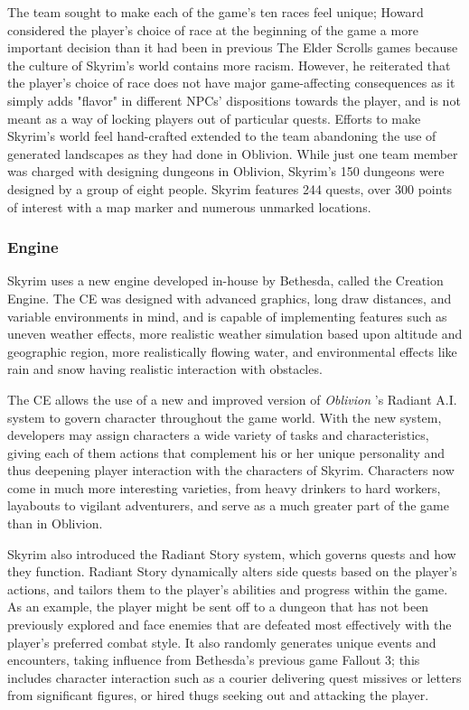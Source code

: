 \documentclass[a4paper,10pt]{book}
\begin{document}
          The team sought to make each of the game's ten races feel unique; Howard considered the player's choice of race at the beginning of the game a more important decision than it had been in previous The Elder Scrolls games because the culture of Skyrim's world contains more racism.
           However, he reiterated that the player's choice of race does not have major game-affecting consequences as it simply adds "flavor" in different NPCs' dispositions towards the player, and is not meant as a way of locking players out of particular quests.
            Efforts to make Skyrim's world feel hand-crafted extended to the team abandoning the use of generated landscapes as they had done in Oblivion. While just one team member was charged with designing dungeons in Oblivion, Skyrim's 150 dungeons were designed by a group of eight people.
             Skyrim features 244 quests, over 300 points of interest with a map marker and numerous unmarked locations.
         
 
 \subsubsection{ Engine }
 
          Skyrim uses a new engine developed in-house by Bethesda, called the Creation Engine.
          The CE was designed with advanced graphics, long draw distances, and variable environments in mind,
           and is capable of implementing features such as uneven weather effects, more realistic weather simulation based upon altitude and geographic region,
            more realistically flowing water, and environmental effects like rain and snow having realistic interaction with obstacles.
         
 
 
          The CE allows the use of a new and improved version of  \textit{Oblivion }'s Radiant A.I.
          system to govern character throughout the game world. With the new system, developers may assign characters a wide variety of tasks and characteristics,
           giving each of them actions that complement his or her unique personality and thus deepening player interaction with the characters of Skyrim.
           Characters now come in much more interesting varieties, from heavy drinkers to hard workers, layabouts to vigilant adventurers, and serve as a much greater part of the game than in Oblivion.
         
 
 

           Skyrim  also introduced the Radiant Story system, which governs quests and how they function. Radiant Story dynamically alters side quests based on the player's actions, and tailors them to the player's abilities and progress within the game.
          As an example, the player might be sent off to a dungeon that has not been previously explored and face enemies that are defeated most effectively with the player's preferred combat style. It also randomly generates unique events and encounters,
           taking influence from Bethesda's previous game Fallout 3; this includes character interaction such as a courier delivering quest missives or letters from significant figures, or hired thugs seeking out and attacking the player.
         
\end{document}
